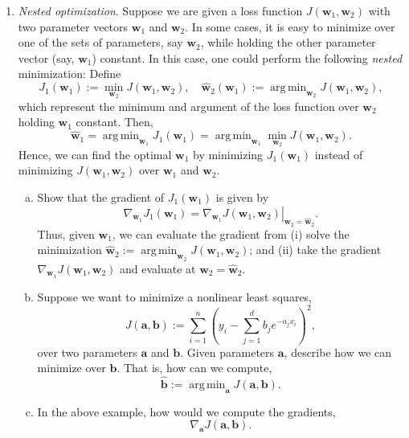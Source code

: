 \documentclass[11pt]{article}
\def\argmin{\mathop{\mathrm{arg\,min}}}
\newcommand{\abf}{\mathbf{a}}
\newcommand{\bbf}{\mathbf{b}}
\newcommand{\wbf}{\mathbf{w}}
\newcommand{\wbfhat}{\widehat{\mathbf{w}}}
\begin{document}
\begin{enumerate}
\item \emph{Nested optimization}.  Suppose we are given a loss function
$J(\wbf_1,\wbf_2)$ with two parameter vectors $\wbf_1$ and $\wbf_2$.
In some cases, it is easy to minimize over one of the sets of parameters, say
$\wbf_2$, while holding the other parameter vector (say, $\wbf_1$) constant.
In this case, one could perform the following \emph{nested} minimization:
Define
\[
    J_1(\wbf_1) := \min_{\wbf_2} J(\wbf_1,\wbf_2), \quad
    \wbfhat_2(\wbf_1) := \argmin_{\wbf_2} J(\wbf_1,\wbf_2),
\]
which represent the minimum and argument of the loss function over $\wbf_2$
holding $\wbf_1$ constant.   Then,
\[
    \wbfhat_1 = \argmin_{\wbf_1} J_1(\wbf_1) = \argmin_{\wbf_1} \min_{\wbf_2}
    J(\wbf_1,\wbf_2).
\]
Hence, we can find the optimal $\wbf_1$ by minimizing $J_1(\wbf_1)$
instead of minimizing $J(\wbf_1,\wbf_2)$ over $\wbf_1$ and $\wbf_2$.
\begin{enumerate}[(a)]
\item Show that the gradient of $J_1(\wbf_1)$ is given by
\[
    \nabla_{\wbf_1} J_1(\wbf_1) = \left. \nabla_{\wbf_1} J(\wbf_1,\wbf_2)\right|_{\wbf_2=\wbfhat_2}.
\]
Thus, given $\wbf_1$, we can evaluate the gradient from (i) solve the minimization 
$\wbfhat_2:= \argmin_{\wbf_2} J(\wbf_1,\wbf_2)$; and (ii) take the gradient 
$\nabla_{\wbf_1} J(\wbf_1,\wbf_2)$ and evaluate at $\wbf_2 = \wbfhat_2$.

\item Suppose we want to minimize a nonlinear least squares, 
\[
    J(\abf,\bbf) := \sum_{i=1}^n \left( y_i -
        \sum_{j=1}^d b_j e^{-a_jx_i} \right)^2,
\]
over two parameters $\abf$ and $\bbf$.  Given parameters $\abf$,
describe how we can minimize over $\bbf$.  That is, how can we compute,
\[
    \hat{\bbf} := \argmin_{\abf} J(\abf,\bbf).
\]

\item In the above example, how would we compute the gradients,
\[
    \nabla_\abf J(\abf,\bbf).
\]

\end{enumerate}

\end{enumerate}
\end{document}
